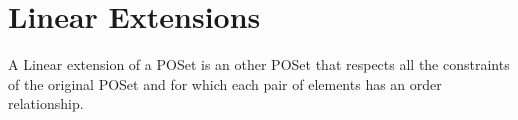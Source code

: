 \section{Linear Extensions}

A Linear extension of a POSet is an other POSet that respects
all the constraints of the original POSet and for which each pair
of elements has an order relationship.